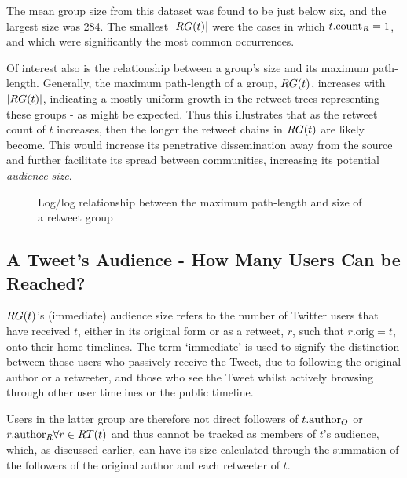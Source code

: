 The mean group size from this dataset was found to be just below six, and the largest size was 284. The smallest $|RG(t)|$ were the cases in which $t.\textrm{count}_R = 1$, and which were significantly the most common occurrences.

Of interest also is the relationship between a group's size and its maximum path-length. Generally, the maximum path-length of a group, $RG(t)$, increases with $|RG(t)|$, indicating a mostly uniform growth in the retweet trees representing these groups - as might be expected. Thus this illustrates that as the retweet count of $t$ increases, then the longer the retweet chains in $RG(t)$ are likely become. This would increase its penetrative dissemination away from the source and further facilitate its spread between communities, increasing its potential \textit{audience size}.

\begin{figure}[h]
\centering
    \caption{Log/log relationship between the maximum path-length and size of a retweet group}
\label{fig:totalretweets-pathlength}
\end{figure}

\subsection{A Tweet's Audience - How Many Users Can be Reached?}
$RG(t)$'s (immediate) audience size refers to the number of Twitter users that have received $t$, either in its original form or as a retweet, $r$, such that $r.\textrm{orig} = t$, onto their home timelines. The term `immediate' is used to signify the distinction between those users who passively receive the Tweet, due to following the original author or a retweeter, and those who see the Tweet whilst actively browsing through other user timelines or the public timeline.

Users in the latter group are therefore not direct followers of $t.\textrm{author}_O$ or $r.\textrm{author}_R \forall r \in RT(t)$ and thus cannot be tracked as members of $t$'s audience, which, as discussed earlier, can have its size calculated through the summation of the followers of the original author and each retweeter of $t$.

